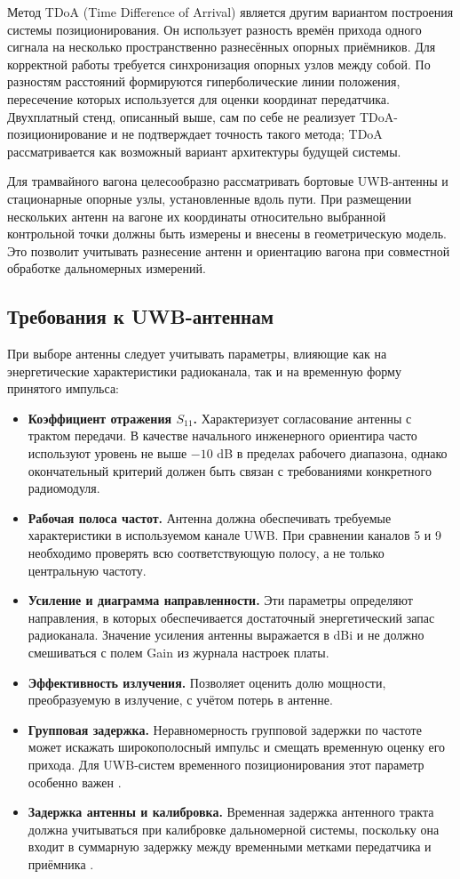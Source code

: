 \documentclass{misisarticle}
\begin{document}
Метод TDoA (Time Difference of Arrival) является другим вариантом построения системы позиционирования. Он использует разность времён прихода одного сигнала на несколько пространственно разнесённых опорных приёмников. Для корректной работы требуется синхронизация опорных узлов между собой. По разностям расстояний формируются гиперболические линии положения, пересечение которых используется для оценки координат передатчика. Двухплатный стенд, описанный выше, сам по себе не реализует TDoA-позиционирование и не подтверждает точность такого метода; TDoA рассматривается как возможный вариант архитектуры будущей системы.

Для трамвайного вагона целесообразно рассматривать бортовые UWB-антенны и стационарные опорные узлы, установленные вдоль пути. При размещении нескольких антенн на вагоне их координаты относительно выбранной контрольной точки должны быть измерены и внесены в геометрическую модель. Это позволит учитывать разнесение антенн и ориентацию вагона при совместной обработке дальномерных измерений.

\subsection{Требования к UWB-антеннам}

При выборе антенны следует учитывать параметры, влияющие как на энергетические характеристики радиоканала, так и на временную форму принятого импульса:
\begin{itemize}
    \item \textbf{Коэффициент отражения \(S_{11}\).} Характеризует согласование антенны с трактом передачи. В качестве начального инженерного ориентира часто используют уровень не выше $-10$ dB в пределах рабочего диапазона, однако окончательный критерий должен быть связан с требованиями конкретного радиомодуля.
    \item \textbf{Рабочая полоса частот.} Антенна должна обеспечивать требуемые характеристики в используемом канале UWB. При сравнении каналов 5 и 9 необходимо проверять всю соответствующую полосу, а не только центральную частоту.
    \item \textbf{Усиление и диаграмма направленности.} Эти параметры определяют направления, в которых обеспечивается достаточный энергетический запас радиоканала. Значение усиления антенны выражается в dBi и не должно смешиваться с полем Gain из журнала настроек платы.
    \item \textbf{Эффективность излучения.} Позволяет оценить долю мощности, преобразуемую в излучение, с учётом потерь в антенне.
    \item \textbf{Групповая задержка.} Неравномерность групповой задержки по частоте может искажать широкополосный импульс и смещать временную оценку его прихода. Для UWB-систем временного позиционирования этот параметр особенно важен \cite{yang2022antenna}.
    \item \textbf{Задержка антенны и калибровка.} Временная задержка антенного тракта должна учитываться при калибровке дальномерной системы, поскольку она входит в суммарную задержку между временными метками передатчика и приёмника \cite{zwirello2012uwb}.
\end{itemize}
\end{document}
